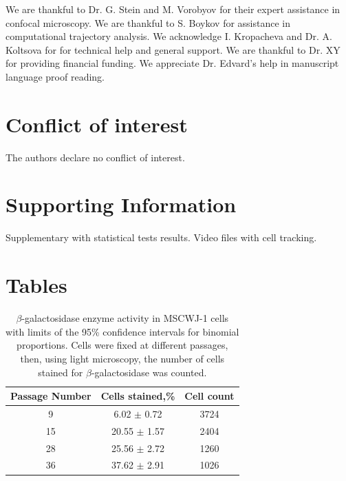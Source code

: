 \documentclass[alpha-refs]{wiley-article}
\begin{document}
We are thankful to Dr. G. Stein and M. Vorobyov for their expert assistance in confocal microscopy.
We are thankful to S. Boykov for assistance in computational trajectory analysis.
We acknowledge I. Kropacheva and Dr. A. Koltsova for for technical help and general support.
We are thankful to Dr. XY for providing financial funding.
We appreciate Dr. Edvard's help in manuscript language proof reading.

\section*{Conflict of interest}
The authors declare no conflict of interest.





\section*{Supporting Information}

Supplementary with statistical tests results.
Video files with cell tracking.

\section*{Tables}

\begin{table}[hbt!]
  \caption{$\beta$-galactosidase enzyme activity in MSCWJ-1 cells with limits of the 95\% confidence intervals for binomial proportions. Cells were fixed at different passages, then, using light microscopy, the number of cells stained for $\beta$-galactosidase was counted.}
  \label{tab}
\centering
\begin{tabular}{c|c|c}
 Passage Number & Cells stained,\% & Cell count  \\
 \hline
9 & 6.02 $\pm$ 0.72 & 3724 \\
15 & 20.55 $\pm$ 1.57 & 2404 \\
28 & 25.56 $\pm$ 2.72 & 1260 \\
36 & 37.62 $\pm$ 2.91 & 1026  \\
\end{tabular}
\end{table}
\end{document}
